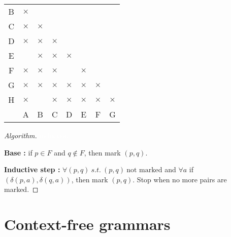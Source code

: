 \documentclass[a4paper,11pt]{article}
\newcommand{\white}[1]{{\textcolor{white}{#1}}}
\begin{document}
\begin{center}
  \begin{tabular}{|c|c|cccccc}
    \cline{1-2}
    B & {\color{green}$\times$} &  &  &  &  &  &  \\ \cline{1-3}
    C & $\times$ & \multicolumn{1}{c|}{$\times$} &  &  &  &  &  \\ \cline{1-4}
    D & {\color{green}$\times$} & \multicolumn{1}{c|}{{\color{green}$\times$}} & \multicolumn{1}{c|}{$\times$} &  &  &  &  \\ \cline{1-5}
    E &  & \multicolumn{1}{c|}{{\color{green}$\times$}} & \multicolumn{1}{c|}{$\times$} & \multicolumn{1}{c|}{{\color{green}$\times$}} &  &  &  \\ \cline{1-6}
    F & {\color{green}$\times$} & \multicolumn{1}{c|}{{\color{green}$\times$}} & \multicolumn{1}{c|}{$\times$} & \multicolumn{1}{c|}{} & \multicolumn{1}{c|}{{\color{green}$\times$}} &  &  \\ \cline{1-7}
    G & {\color{red}$\times$} & \multicolumn{1}{c|}{{\color{green}$\times$}} & \multicolumn{1}{c|}{$\times$} & \multicolumn{1}{c|}{{\color{green}$\times$}} & \multicolumn{1}{c|}{{\color{red}$\times$}} & \multicolumn{1}{c|}{{\color{green}$\times$}} &  \\ \hline
    H & {\color{green}$\times$} & \multicolumn{1}{c|}{} & \multicolumn{1}{c|}{$\times$} & \multicolumn{1}{c|}{{\color{green}$\times$}} & \multicolumn{1}{c|}{{\color{green}$\times$}} & \multicolumn{1}{c|}{{\color{green}$\times$}} & \multicolumn{1}{c|}{{\color{green}$\times$}} \\ \hline
      & A & \multicolumn{1}{c|}{B} & \multicolumn{1}{c|}{C} & \multicolumn{1}{c|}{D} & \multicolumn{1}{c|}{E} & \multicolumn{1}{c|}{F} & \multicolumn{1}{c|}{G} \\ \hline
  \end{tabular}
\end{center}

\begin{proof}[Algorithm]
  \white{induction}
  
  \textbf{Base : } if $p \in F$ and $q \not \in F$, then mark $(p,q)$.
  
  \textbf{Inductive step : } $\forall (p,q)\ s.t.\ (p,q)\ \text{not marked}$ and
  $\forall a$ if $(\delta(p,a),\delta(q,a))$, then mark $(p,q)$. Stop when no
  more pairs are marked.
\end{proof}

\section{Context-free grammars}
\end{document}
